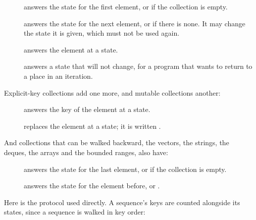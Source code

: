 \begin{description}
\item[]
  answers the state for the first element, or  if the
  collection is empty.
\item[]
  answers the state for the next element, or  if there is
  none. It may change the state it is given, which must not be used
  again.
\item[]
  answers the element at a state.
\item[]
  answers a state that  will not change, for a program
  that wants to return to a place in an iteration.
\end{description}

\noindent Explicit-key collections add one more, and mutable collections
another:

\begin{description}
\item[]
  answers the key of the element at a state.
\item[]
  replaces the element at a state; it is written
  .
\end{description}

\noindent And collections that can be walked backward, the vectors, the
strings, the deques, the arrays and the bounded ranges, also have:

\begin{description}
\item[]
  answers the state for the last element, or  if the
  collection is empty.
\item[]
  answers the state for the element before, or .
\end{description}

Here is the protocol used directly. A sequence's keys are counted
alongside its states, since a sequence is walked in key order:

